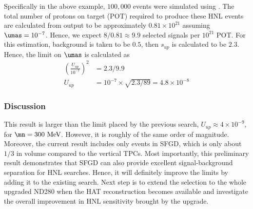         Specifically in the above example, $100,000$ \genie events were simulated using . 
        The total number of protons on target (POT) required to produce these HNL events are calculated from  output to be approximately $0.81\times10^{21}$ assuming $\umas=10^{-7}$. 
        Hence, we expect $8/0.81\approx9.9$ selected signals per $10^{21}$ POT.
        For this estimation, background is taken to be $0.5$, then $s_{up}$ is calculated to be $2.3$. 
        Hence, the limit on $\umas$ is calculated as 
        \begin{align}
            (\frac{U_{up}}{10^{-7}})^2 & =  2.3 / 9.9 \\
            U_{up} & = 10^{-7} \times \sqrt{2.3/89} = 4.8\times10^{-8}
        \end{align}

        \subsubsection{Discussion}
        This result is larger than the limit placed by the previous search, $U_{up}\approx4\times10^{-9}$, for $\mn=300~\mev$. 
        However, it is roughly of the same order of magnitude. 
        Moreover, the current result includes only events in SFGD, which is only about $1/3$ in volume compared to the vertical TPCs. 
        Most importantly, this preliminary result demonstrates that SFGD can also provide excellent signal-background separation for HNL searches.
        Hence, it will definitely improve the limits by adding it to the existing search. 
        Next step is to extend the selection to the whole upgraded ND280 when the HAT reconstruction becomes available and investigate the overall improvement in HNL sensitivity brought by the upgrade. 
 